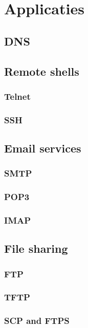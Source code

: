 \chapter{Applicaties}
\label{chap:applicaties}


\section{DNS}


\section{Remote shells}
\subsection{Telnet}
\subsection{SSH}


\section{Email services}

\subsection{SMTP}
\subsection{POP3}
\subsection{IMAP}

\section{File sharing}

\subsection{FTP}
\subsection{TFTP}
\subsection{SCP and FTPS}


